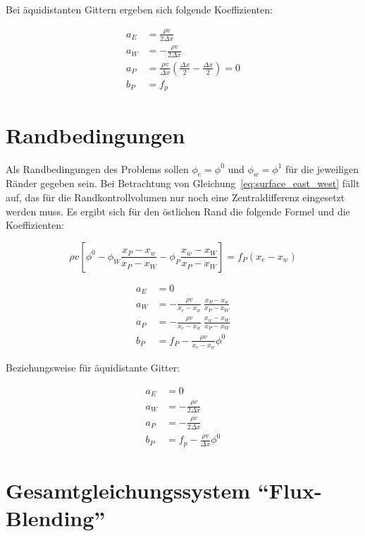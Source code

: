\documentclass[11pt, ngerman,colorback,accentcolor=tud2d]{tudreport}
\begin{document}
Bei äquidistanten Gittern ergeben sich folgende Koeffizienten:

\begin{align*}
  a_E &= \frac{\rho v}{2\Delta x}\\
  a_W &=-\frac{\rho v}{2\Delta x}\\
  a_P &= \frac{\rho v}{\Delta x} \left({\frac{\Delta x}{2}
-\frac{\Delta x}{2}}\right) = 0\\
  b_P &= f_p
\end{align*}


\section{Randbedingungen}

Als Randbedingungen des Problems sollen $\phi_e = \phi^0$ und $\phi_w = \phi^1$ für die jeweiligen
Ränder gegeben sein. Bei Betrachtung von Gleichung~\eqref{eq:surface_east_west}
fällt auf, das für die Randkontrollvolumen nur noch eine Zentraldifferenz eingesetzt
werden muss. Es ergibt sich für den östlichen Rand die folgende Formel und die
Koeffizienten:

\begin{equation*}
  \rho v \left[{
  \phi^0  -\phi_W \frac{x_P-x_w}{x_P-x_W} - \phi_P \frac{x_w-x_W}{x_P-x_W}
  }\right]
  = f_P(x_e-x_w)
\end{equation*}

\begin{align*}
  a_E &= 0\\
  a_W &= -\frac{\rho v}{x_e-x_w}\ \frac{x_P-x_w}{x_P-x_W}\\
  a_P &= -\frac{\rho v}{x_e-x_w}\ \frac{x_w-x_W}{x_P-x_W}\\
  b_P &= f_P - \frac{\rho v}{x_e-x_w} \phi^0
\end{align*}

Beziehungsweise für äquidistante Gitter:

\begin{align*}
  a_E &= 0\\
  a_W &=-\frac{\rho v}{2\Delta x}\\
  a_P &=-\frac{\rho v}{2 \Delta x}\\
  b_P &= f_p- \frac{\rho v}{\Delta x}\phi^0
\end{align*}






\section{Gesamtgleichungssystem ``Flux-Blending''}
\end{document}
